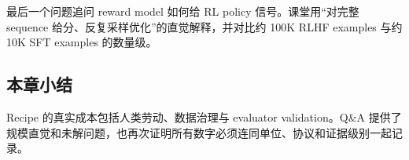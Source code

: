最后一个问题追问 reward model 如何给 RL policy 信号。课堂用“对完整 sequence 给分、反复采样优化”的直觉解释，并对比约 100K RLHF examples 与约 10K SFT examples 的数量级。


\subsection{本章小结}

Recipe 的真实成本包括人类劳动、数据治理与 evaluator validation。Q\&A 提供了规模直觉和未解问题，也再次证明所有数字必须连同单位、协议和证据级别一起记录。

